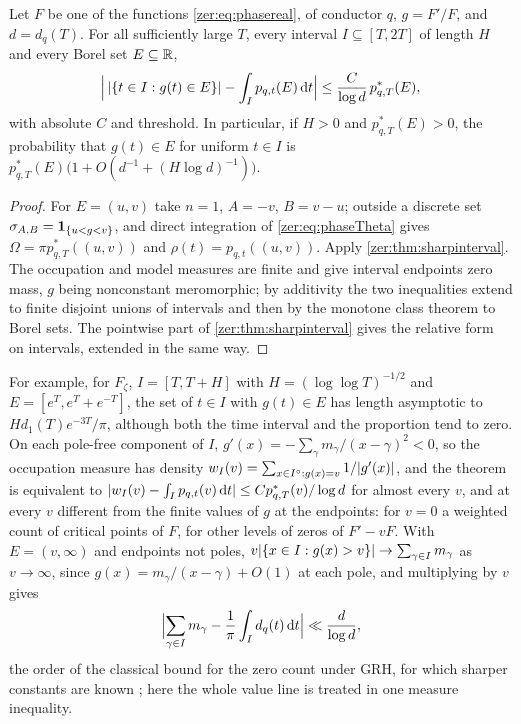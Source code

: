 \begin{theorem}\label{zer:thm:uniformcauchy}
Let $F$ be one of the functions \eqref{zer:eq:phasereal}, of conductor $q$, $g=F'/F$, and $d=d_q(T)$. For all
sufficiently large $T$, every interval $I\subseteq[T,2T]$ of length $H$ and every Borel set $E\subseteq\mathbb{R}$,
\[
 \Bigl|\,\lvert\{t\in I:g(t)\in E\}\rvert-\int_Ip_{q,t}(E)\,\mathrm{d} t\Bigr|\le\frac C{\log d}\,p^*_{q,T}(E),
\]
with absolute $C$ and threshold. In particular, if $H>0$ and $p^*_{q,T}(E)>0$, the probability that $g(t)\in E$
for uniform $t\in I$ is $p^*_{q,T}(E)\bigl(1+O(d^{-1}+(H\log d)^{-1})\bigr)$.
\end{theorem}
\begin{proof}
For $E=(u,v)$ take $n=1$, $A=-v$, $B=v-u$; outside a discrete set $\sigma_{A,B}=\mathbf 1_{\{u<g<v\}}$, and direct
integration of \eqref{zer:eq:phaseTheta} gives $\Omega=\pi p^*_{q,T}((u,v))$ and $\rho(t)=p_{q,t}((u,v))$. Apply
\cref{zer:thm:sharpinterval}. The occupation and model measures are finite and give interval endpoints
zero mass, $g$ being nonconstant meromorphic; by additivity the two inequalities extend to finite disjoint
unions of intervals and then by the monotone class theorem to Borel sets. The pointwise part of
\cref{zer:thm:sharpinterval} gives the relative form on intervals, extended in the same way.
\end{proof}

For example, for $F_\zeta$, $I=[T,T+H]$ with $H=(\log\log T)^{-1/2}$ and $E=[e^T,e^T+e^{-T}]$, the set of
$t\in I$ with $g(t)\in E$ has length asymptotic to $Hd_1(T)e^{-3T}/\pi$, although both the time interval and the
proportion tend to zero.
On each pole-free component of $I$, $g'(x)=-\sum_\gamma m_\gamma/(x-\gamma)^2<0$, so the occupation measure has
density $w_I(v)=\sum_{x\in I^\circ:g(x)=v}1/\lvert g'(x)\rvert$, and the theorem is equivalent to
$\lvert w_I(v)-\int_Ip_{q,t}(v)\,\mathrm{d} t\rvert\le Cp^*_{q,T}(v)/\log d$ for almost every $v$, and at every $v$ different
from the finite values of $g$ at the endpoints: for $v=0$ a weighted count of critical points of $F$, for other
levels of zeros of $F'-vF$. With $E=(v,\infty)$ and endpoints not poles, $v\lvert\{x\in I:g(x)>v\}\rvert\to\sum_{\gamma\in I}m_\gamma$
as $v\to\infty$, since $g(x)=m_\gamma/(x-\gamma)+O(1)$ at each pole, and multiplying by $v$ gives
\[
 \Bigl|\sum_{\gamma\in I}m_\gamma-\frac1\pi\int_Id_q(t)\,\mathrm{d} t\Bigr|\ll\frac d{\log d},
\]
the order of the classical bound for the zero count under GRH, for which sharper constants are known
\cite{CarneiroChandeeMilinovich2015Note}; here the whole value line is treated in one measure inequality.

